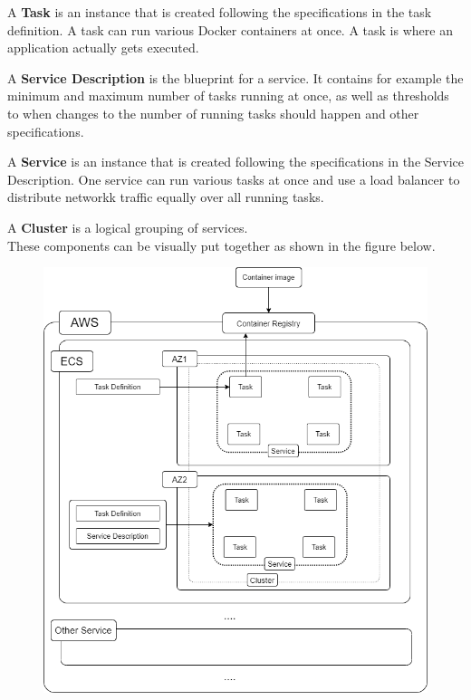 A \textbf{Task} is an instance that is created following the specifications in the task definition. A task can run various Docker containers at once. A task is where an application actually gets executed.

A \textbf{Service Description} is the blueprint for a service. It contains for example the minimum and maximum number of tasks running at once, as well as thresholds to when changes to the number of running tasks should happen and other specifications.

A \textbf{Service} is an instance that is created following the specifications in the Service Description. One service can run various tasks at once and use a load balancer to distribute networkk traffic equally over all running tasks.

A \textbf{Cluster} is a logical grouping of services. \\

These components can be visually put together as shown in the figure below. \citep[with adaptions]{AwsEcs} 
\begin{figure}[H]
\centering
\includegraphics[scale=.45]{Bilder/EcsStructure.png}
\label{ex311}
\end{figure}

